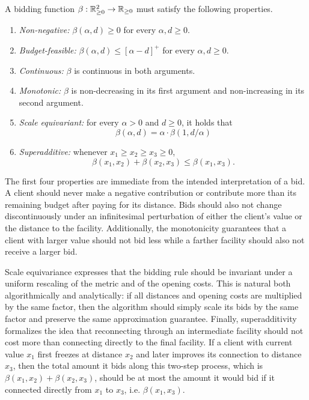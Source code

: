 \begin{definition}
A bidding function $\beta : \mathbb R_{\ge 0}^2 \to \mathbb R_{\ge 0}$ must satisfy the following properties.
\begin{enumerate}
    \item \emph{Non-negative:} $\beta(\alpha,d)\ge 0$ for every $\alpha,d \ge 0$.
    \item \emph{Budget-feasible:} $\beta(\alpha,d) \leq [\alpha-d]^+$ for every $\alpha,d \ge 0$.
    \item \emph{Continuous:} $\beta$ is continuous in both arguments.
    \item \emph{Monotonic:} $\beta$ is non-decreasing in its first argument and non-increasing in its second argument.
    \item \emph{Scale equivariant:} for every $\alpha>0$ and $d\ge 0$, it holds that 
    $$ \beta(\alpha,d)=\alpha \cdot \beta(1,d/\alpha)$$
    \item \emph{Superadditive:} whenever $x_1 \ge x_2 \ge x_3 \ge 0$,
    $$
        \beta(x_1,x_2) + \beta(x_2,x_3) \le \beta(x_1,x_3).
    $$
\end{enumerate}
\end{definition}

The first four properties are immediate from the intended interpretation of a bid. A client should never make a negative contribution or contribute more than its remaining budget after paying for its distance. Bids should also not change discontinuously under an infinitesimal perturbation of either the client's value or the distance to the facility. Additionally, the monotonicity guarantees that a client with larger value should not bid less while a farther facility should also not receive a larger bid.

Scale equivariance expresses that the bidding rule should be invariant under a uniform rescaling of the metric and of the opening costs. This is natural both algorithmically and analytically: if all distances and opening costs are multiplied by the same factor, then the algorithm should simply scale its bids by the same factor and preserve the same approximation guarantee.
Finally, superadditivity formalizes the idea that reconnecting through an intermediate facility should not cost more than connecting directly to the final facility. If a client with current value $x_1$ first freezes at distance $x_2$ and later improves its connection to distance $x_3$, then the total amount it bids along this two-step process, which is $\beta(x_1, x_2) + \beta(x_2, x_3)$, should be at most the amount it would bid if it connected directly from $x_1$ to $x_3$, i.e. $\beta(x_1,x_3)$.

